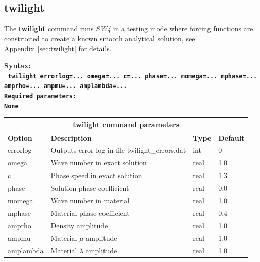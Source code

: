 \documentclass[11pt]{report}
\begin{document}
\subsection{twilight}
\label{keyword:twilight}
The {\bf twilight} command runs \emph{SW4} in a testing mode where forcing functions are constructed to
create a known smooth analytical solution, see Appendix~\ref{sec:twilight} for details. 
\begin{flushleft}
\bf
Syntax:\\
\tt
twilight errorlog=... omega=... c=... phase=... momega=... mphase=... amprho=... ampmu=... amplambda=...
\\
\bf Required parameters:\\
\rm
None
\end{flushleft}
\begin{center}
\begin{tabular}{|l|p{8cm}|l|l|} \hline
\multicolumn{4}{|c|}{\bf twilight command parameters}\\ \hline
\bf{Option} & \bf{Description} & \bf{Type} & \bf{Default} \\ \hline \hline
errorlog & Outputs error log in file twilight\_errors.dat & int & 0 \\ \hline
omega & Wave number in exact solution                           & real & 1.0 \\ \hline
c & Phase speed in exact solution                         & real & 1.3 \\ \hline
phase & Solution phase coefficient                        & real & 0.0 \\ \hline
momega & Wave number in material                          & real & 1.0 \\ \hline
mphase & Material phase coefficient                       & real & 0.4 \\ \hline
amprho & Density amplitude                                & real & 1.0 \\ \hline
ampmu & Material $\mu$ amplitude                          & real & 1.0 \\ \hline
amplambda & Material $\lambda$ amplitude                  & real & 1.0 \\ \hline
\end{tabular}
\end{center}

\end{document}
